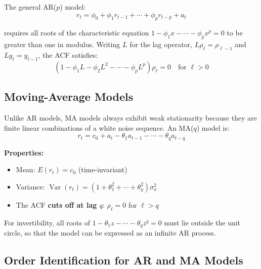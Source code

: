 The general AR($p$) model:
$$r_t = \phi_0 + \phi_1 r_{t-1} + \cdots + \phi_p r_{t-p} + a_t$$

requires all roots of the characteristic equation $1 - \phi_1 x - \cdots - \phi_p x^p = 0$ to be greater than one in modulus. Writing $L$ for the lag operator, $L\rho_\ell=\rho_{\ell-1}$ and $Ly_t=y_{t-1}$, the ACF satisfies:
$$(1 - \phi_1 L - \phi_2 L^2 - \cdots - \phi_p L^p)\rho_\ell = 0 \quad \text{for } \ell > 0$$

\subsection{Moving-Average Models}

Unlike AR models, MA models always exhibit weak stationarity because they are finite linear combinations of a white noise sequence. An MA($q$) model is:
$$r_t = c_0 + a_t - \theta_1 a_{t-1} - \cdots - \theta_q a_{t-q}$$

\textbf{Properties:}
\begin{itemize}
    \item Mean: $E(r_t) = c_0$ (time-invariant)
    \item Variance: $\operatorname{Var}(r_t) = (1 + \theta_1^2 + \cdots + \theta_q^2)\sigma_a^2$
    \item The ACF \textbf{cuts off at lag $q$}: $\rho_\ell = 0$ for $\ell > q$
\end{itemize}

For invertibility, all roots of $1 - \theta_1 z - \cdots - \theta_q z^q = 0$ must lie outside the unit circle, so that the model can be expressed as an infinite AR process.

\subsection{Order Identification for AR and MA Models}
